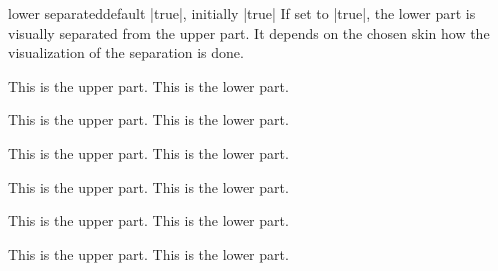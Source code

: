 \clearpage
\begin{docTcbKey}{lower separated}{}{default |true|, initially |true|}
If set to |true|, the lower part is visually separated from the upper part.
It depends on the chosen skin how the visualization of the separation is done.

\begin{dispExample}

\begin{tcolorbox}[title=Lower separated]
This is the upper part.
\tcblower
This is the lower part.
\end{tcolorbox}\hfill
\begin{tcolorbox}[title=Lower not separated,lower separated=false]
This is the upper part.
\tcblower
This is the lower part.
\end{tcolorbox}
\par\bigskip\par
\begin{tcolorbox}[sidebyside,title=Lower separated]
This is the upper part.
\tcblower
This is the lower part.
\end{tcolorbox}\hfill
\begin{tcolorbox}[sidebyside,title=Lower not separated,lower separated=false]
This is the upper part.
\tcblower
This is the lower part.
\end{tcolorbox}
\par\bigskip\par
\begin{tcolorbox}[beamer,title=Lower separated]
This is the upper part.
\tcblower
This is the lower part.
\end{tcolorbox}\hfill
\begin{tcolorbox}[beamer,title=Lower not separated,lower separated=false]
This is the upper part.
\tcblower
This is the lower part.
\end{tcolorbox}
\end{dispExample}
\end{docTcbKey}


